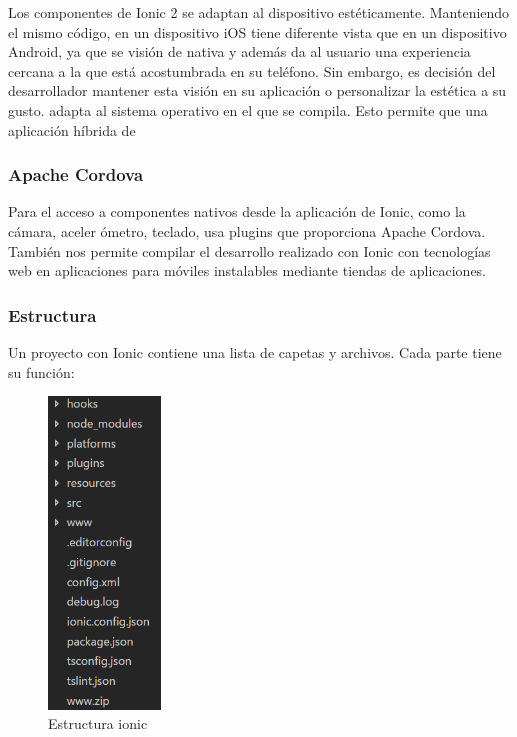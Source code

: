 \documentclass[a4paper, 12pt]{book}
\begin{document}
Los componentes de Ionic 2 se adaptan al dispositivo est\'eticamente. Manteniendo el mismo
c\'odigo, en un dispositivo iOS tiene diferente vista que en un dispositivo Android, ya que se
visi\'on de nativa y adem\'as da al usuario una experiencia cercana a la que est\'a acostumbrada en
su tel\'efono. Sin embargo, es decisi\'on del desarrollador mantener esta visi\'on en su aplicaci\'on o
personalizar la est\'etica a su gusto.
adapta al sistema operativo en el que se compila. Esto permite que una aplicaci\'on h\'ibrida de

\subsubsection{Apache Cordova}
\label{subsec:estilo}

Para el acceso a componentes nativos desde la aplicaci\'on de Ionic, como la c\'amara, aceler
\'ometro, teclado, usa plugins que proporciona Apache Cordova. Tambi\'en nos permite compilar
el desarrollo realizado con Ionic con tecnolog\'ias web en aplicaciones para m\'oviles instalables
mediante tiendas de aplicaciones.

\subsubsection{Estructura}
\label{subsec:estilo}

Un proyecto con Ionic contiene una lista de capetas y archivos. Cada parte tiene su funci\'on:

\begin{figure}[H]
  \centering
  \includegraphics[width=3cm, keepaspectratio]{img/estructura_ionic}
  \caption{Estructura ionic}
  \label{figura:estructura_ionic}
\end{figure}
\end{document}
